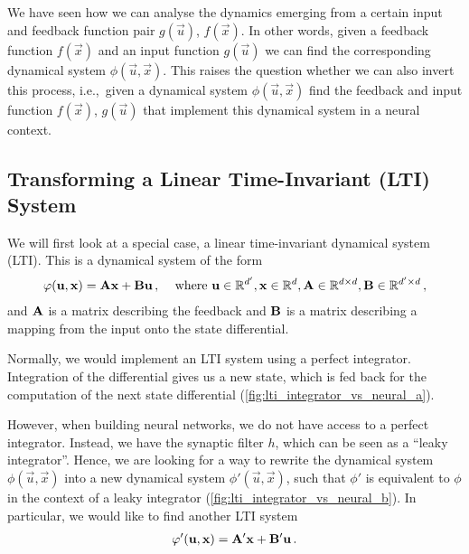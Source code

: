 \documentclass[10pt,letterpaper,oneside]{article}
\begin{document}
We have seen how we can analyse the dynamics emerging from a certain input and feedback function pair $g(\vec u)$, $f(\vec x)$. In other words, given a feedback function $f(\vec x)$ and an input function $g(\vec u)$ we can find the corresponding dynamical system $\phi(\vec u, \vec x)$. This raises the question whether we can also invert this process, i.e.,~given a dynamical system $\phi(\vec u, \vec x)$ find the feedback and input function $f(\vec x)$, $g(\vec u)$ that implement this dynamical system in a neural context.

\subsection{Transforming a Linear Time-Invariant (LTI) System}
We will first look at a special case, a linear time-invariant dynamical system (LTI). This is a dynamical system of the form
\begin{align*}
	\varphi({\mathbf{u}}, {\mathbf{x}}) = {\mathbf{A}} {\mathbf{x}} + {\mathbf{B}} {\mathbf{u}} \,, && \text{ where } {\mathbf{u}} \in \mathbb{R}^{d'}, {\mathbf{x}} \in \mathbb{R}^{d}, {\mathbf{A}} \in \mathbb{R}^{d \times d}, {\mathbf{B}} \in \mathbb{R}^{d' \times d} \,,
\end{align*}
and ${\mathbf{A}}$ is a matrix describing the feedback and ${\mathbf{B}}$ is a matrix describing a mapping from the input onto the state differential.

Normally, we would implement an LTI system using a perfect integrator. Integration of the differential gives us a new state, which is fed back for the computation of the next state differential (\cref{fig:lti_integrator_vs_neural_a}).

However, when building neural networks, we do not have access to a perfect integrator. Instead, we have the synaptic filter $h$, which can be seen as a \enquote{leaky integrator}. Hence, we are looking for a way to rewrite the dynamical system $\phi(\vec u, \vec x)$ into a new dynamical system $\phi'(\vec u, \vec x)$, such that $\phi'$ is equivalent to $\phi$ in the context of a leaky integrator (\cref{fig:lti_integrator_vs_neural_b}). In particular, we would like to find another LTI system
\begin{align*}
	\varphi'({\mathbf{u}}, {\mathbf{x}}) = {\mathbf{A}}' {\mathbf{x}} + {\mathbf{B}}' {\mathbf{u}} \,.
\end{align*}
\end{document}
